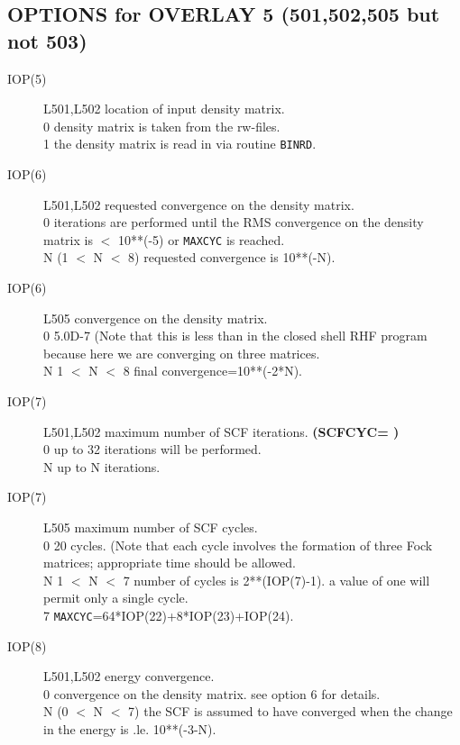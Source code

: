 \subsection{\sf OPTIONS for OVERLAY 5 (501,502,505 but not 503)}
\begin{description}
\item[IOP(5)] L501,L502  location of input density matrix.  \\
0  density matrix is taken from the rw-files. \\
1  the density matrix is read in via routine {\tt BINRD}. \\
\item[IOP(6)] L501,L502 requested convergence on the density matrix.  \\
0  iterations are performed until the RMS convergence on the density 
matrix is $<$ 10**(-5) or {\tt MAXCYC} is reached.  \\
N (1 $<$ N $<$ 8) requested convergence is 10**(-N).  \\
\item[IOP(6)] L505   convergence on the density matrix.  \\
0  5.0D-7 (Note that this is less than in the closed shell RHF 
program because here we are converging on three matrices.  \\
N 1 $<$ N $<$ 8 final convergence=10**(-2*N).  \\
\item[IOP(7)] L501,L502  maximum number of SCF iterations. 
{\bf (SCFCYC= )}  \\
0  up to 32 iterations will be performed. \\
N up to N iterations.  \\
\item[IOP(7)] L505  maximum number of SCF cycles.  \\
0  20 cycles. (Note that each cycle involves the formation of three 
Fock matrices;  appropriate time should be allowed.  \\
N 1 $<$ N $<$ 7 number of cycles is 2**(IOP(7)-1).  a value of
one will permit only a single cycle.  \\
7  {\tt MAXCYC}=64*IOP(22)+8*IOP(23)+IOP(24). \\
\item[IOP(8)] L501,L502  energy convergence.  \\
0  convergence on the density matrix. 
see option 6 for details.  \\
N (0 $<$ N $<$ 7)  the SCF is assumed to have converged when the
change in the energy is .le. 10**(-3-N).  \\

\end{description}
